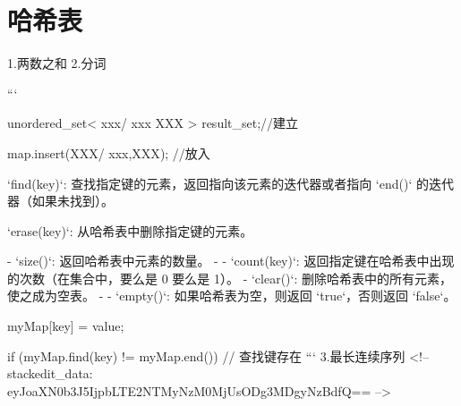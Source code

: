 \chapter{哈希表}
1.两数之和
2.分词

```

unordered_set< xxx/ xxx XXX > result_set;//建立

map.insert(XXX/ {xxx,XXX}); //放入

`find(key)`: 查找指定键的元素，返回指向该元素的迭代器或者指向 `end()` 的迭代器（如果未找到）。

`erase(key)`: 从哈希表中删除指定键的元素。

-   `size()`: 返回哈希表中元素的数量。
- -   `count(key)`: 返回指定键在哈希表中出现的次数（在集合中，要么是 0 要么是 1）。
-   `clear()`: 删除哈希表中的所有元素，使之成为空表。
- -   `empty()`: 如果哈希表为空，则返回 `true`，否则返回 `false`。

myMap[key] = value;

if (myMap.find(key) != myMap.end()) {
    // 查找键存在
}
```
3.最长连续序列
<!--stackedit_data:
eyJoaXN0b3J5IjpbLTE2NTMyNzM0MjUsODg3MDgyNzBdfQ==
-->